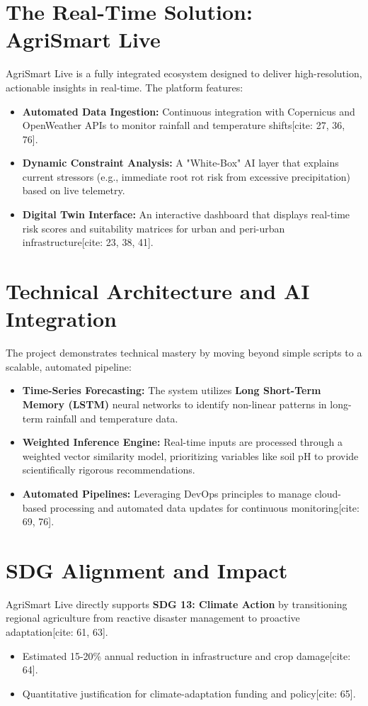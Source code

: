\documentclass[11pt]{article}
\begin{document}
\section{The Real-Time Solution: AgriSmart Live}
AgriSmart Live is a fully integrated ecosystem designed to deliver high-resolution, actionable insights in real-time. The platform features:
\begin{itemize}[noitemsep]
    \item \textbf{Automated Data Ingestion:} Continuous integration with Copernicus and OpenWeather APIs to monitor rainfall and temperature shifts[cite: 27, 36, 76].
    \item \textbf{Dynamic Constraint Analysis:} A "White-Box" AI layer that explains current stressors (e.g., immediate root rot risk from excessive precipitation) based on live telemetry.
    \item \textbf{Digital Twin Interface:} An interactive dashboard that displays real-time risk scores and suitability matrices for urban and peri-urban infrastructure[cite: 23, 38, 41].
\end{itemize}

\section{Technical Architecture and AI Integration}
The project demonstrates technical mastery by moving beyond simple scripts to a scalable, automated pipeline:
\begin{itemize}
    \item \textbf{Time-Series Forecasting:} The system utilizes \textbf{Long Short-Term Memory (LSTM)} neural networks to identify non-linear patterns in long-term rainfall and temperature data.
    \item \textbf{Weighted Inference Engine:} Real-time inputs are processed through a weighted vector similarity model, prioritizing variables like soil pH to provide scientifically rigorous recommendations.
    \item \textbf{Automated Pipelines:} Leveraging DevOps principles to manage cloud-based processing and automated data updates for continuous monitoring[cite: 69, 76].
\end{itemize}

\section{SDG Alignment and Impact}
AgriSmart Live directly supports \textbf{SDG 13: Climate Action} by transitioning regional agriculture from reactive disaster management to proactive adaptation[cite: 61, 63].
\begin{itemize}[noitemsep]
    \item Estimated 15-20\% annual reduction in infrastructure and crop damage[cite: 64].
    \item Quantitative justification for climate-adaptation funding and policy[cite: 65].
\end{itemize}
\end{document}
